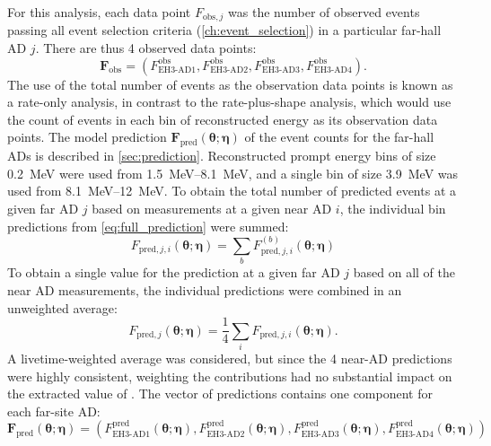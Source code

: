 For this analysis, each data point $F_{\text{obs},j}$
was the number of observed events passing all event selection criteria
(\cref{ch:event_selection})
in a particular far-hall AD $j$.
There are thus 4 observed data points:
\begin{equation}
    \mathbf{F}_{\text{obs}} =
    (F^{\text{obs}}_{\text{EH3-AD1}},
    F^{\text{obs}}_{\text{EH3-AD2}},
    F^{\text{obs}}_{\text{EH3-AD3}},
    F^{\text{obs}}_{\text{EH3-AD4}}).
\end{equation}
The use of the total number of events as the observation data points
is known as a rate-only analysis,
in contrast to the rate-plus-shape analysis, which would use
the count of events in each bin of reconstructed energy
as its observation data points.
The model prediction
$\mathbf{F}_{\text{pred}}(\boldsymbol{\theta};\boldsymbol{\eta})$
of the event counts for the far-hall ADs
is described in \cref{sec:prediction}.
Reconstructed prompt energy bins of size \SI{0.2}{\MeV} were used from \SIrange{1.5}{8.1}{\MeV},
and a single bin of size \SI{3.9}{\MeV} was used from \SIrange{8.1}{12}{\MeV}.
To obtain the total number of predicted events at a given far AD $j$
based on measurements at a given near AD $i$,
the individual bin predictions from \cref{eq:full_prediction} were summed:
\begin{equation}\label{eq:hybrid_rate_shape}
    F_{\text{pred},j,i}(\boldsymbol{\theta};\boldsymbol{\eta}) =
    \sum_b F_{\text{pred},j,i}^{(b)}(\boldsymbol{\theta};\boldsymbol{\eta})
\end{equation}
To obtain a single value for the prediction at a given far AD $j$
based on all of the near AD measurements,
the individual predictions were combined in an unweighted average:
\begin{equation}\label{eq:average_near}
    F_{\text{pred},j}(\boldsymbol{\theta};\boldsymbol{\eta}) =
    \frac{1}{4} \sum_i
    F_{\text{pred},j,i}(\boldsymbol{\theta};\boldsymbol{\eta}).
\end{equation}
A livetime-weighted average was considered,
but since the 4 near-AD predictions were highly consistent,
weighting the contributions had no substantial impact
on the extracted value of \thetaot{}.
The vector of predictions contains one component for each far-site AD:
\begin{equation}\label{eq:f_pred_vector}
    \mathbf{F}_\text{pred}(\boldsymbol{\theta};\boldsymbol{\eta}) =
    (
    F^{\text{pred}}_{\text{EH3-AD1}}(\boldsymbol{\theta};\boldsymbol{\eta}),
    F^{\text{pred}}_{\text{EH3-AD2}}(\boldsymbol{\theta};\boldsymbol{\eta}),
    F^{\text{pred}}_{\text{EH3-AD3}}(\boldsymbol{\theta};\boldsymbol{\eta}),
    F^{\text{pred}}_{\text{EH3-AD4}}(\boldsymbol{\theta};\boldsymbol{\eta})
    )
\end{equation}
